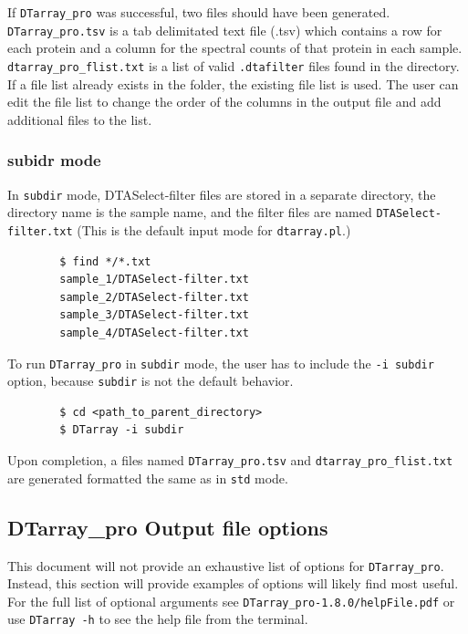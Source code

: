 \documentclass[12pt]{article}
\newcommand{\VERSION}{1.8.0}
\begin{document}
	\noindent
	If \texttt{DTarray\_pro} was successful, two files should have been generated.  \texttt{DTarray\_pro.tsv} is a tab delimitated text file (.tsv) which contains a row for each protein and a column for the spectral counts of that protein in each sample.  \texttt{dtarray\_pro\_flist.txt} is a list of valid \texttt{.dtafilter} files found in the directory.  If a file list already exists in the folder, the existing file list is used.  The user can edit the file list to change the order of the columns in the output file and add additional files to the list.  
	
	\pagebreak
	\subsubsection{subidr mode}
	
	In \texttt{subdir} mode, DTASelect-filter files are stored in a separate directory, the directory name is the sample name, and the filter files are named \texttt{DTASelect-filter.txt} (This is the default input mode for \texttt{dtarray.pl}.)
	
	\begin{lstlisting}
		$ find */*.txt
		sample_1/DTASelect-filter.txt
		sample_2/DTASelect-filter.txt
		sample_3/DTASelect-filter.txt
		sample_4/DTASelect-filter.txt
	\end{lstlisting}
	
	\noindent
	To run \texttt{DTarray\_pro} in \texttt{subdir} mode, the user has to include the \texttt{-i subdir} option, because \texttt{subdir} is not the default behavior.  
	
	\begin{lstlisting}
		$ cd <path_to_parent_directory>
		$ DTarray -i subdir
	\end{lstlisting}
	
	\noindent
	Upon completion, a files named \texttt{DTarray\_pro.tsv} and \texttt{dtarray\_pro\_flist.txt} are generated formatted the same as in \texttt{std} mode.
	
	\subsection{DTarray\_pro Output file options}
	
	This document will not provide an exhaustive list of options for \texttt{DTarray\_pro}. Instead, this section will provide examples of options will likely find most useful.  For the full list of optional arguments see \texttt{DTarray\_pro-\VERSION/helpFile.pdf} or use \texttt{DTarray -h} to see the help file from the terminal.
	
\end{document}
